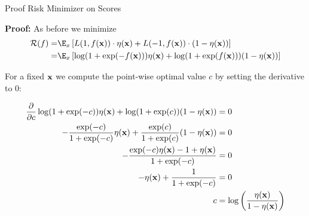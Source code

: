 \documentclass[11pt,compress,t,notes=noshow, xcolor=table]{beamer}
\begin{document}
\begin{frame2}[small]{Proof Risk Minimizer on Scores}

\textbf{Proof: } As before we minimize 
\begin{align*}
\riskf =& \E_x \left[L(1, \fx) \cdot \eta(\xv) + L(-1, \fx) \cdot (1 - \eta(\xv)) \right] \\
=& \E_x \left[ \log(1 + \exp(- \fx)) \eta(\xv)+ \log(1 + \exp(\fx)) (1 - \eta(\xv)) \right] 
\end{align*}

For a fixed $\mathbf{x}$ we compute the point-wise optimal value $c$ by setting the derivative to $0$: 

\begin{footnotesize}
\begin{align*}
\frac{\partial }{\partial c} \log(1 + \exp(-c)) \eta(\mathbf{x})+ \log(1 + \exp(c)) (1 - \eta(\mathbf{x})) &= 0 \\
- \frac{\exp(-c)}{1 + \exp(-c)} \eta(\mathbf{x}) + \frac{\exp(c)}{1 + \exp(c)} (1 - \eta(\mathbf{x})) &= 0 \\ 
- \frac{\exp(-c) \eta(\mathbf{x}) - 1 + \eta(\mathbf{x})}{1 + \exp(-c)} &= 0 \\
- \eta(\mathbf{x}) + \frac{1}{1 + \exp(-c)} &= 0\\
c &= \log\left(\frac{\eta(\mathbf{x})}{1 - \eta(\mathbf{x})}\right)
\end{align*}
\end{footnotesize}

\end{frame2}
\end{document}

